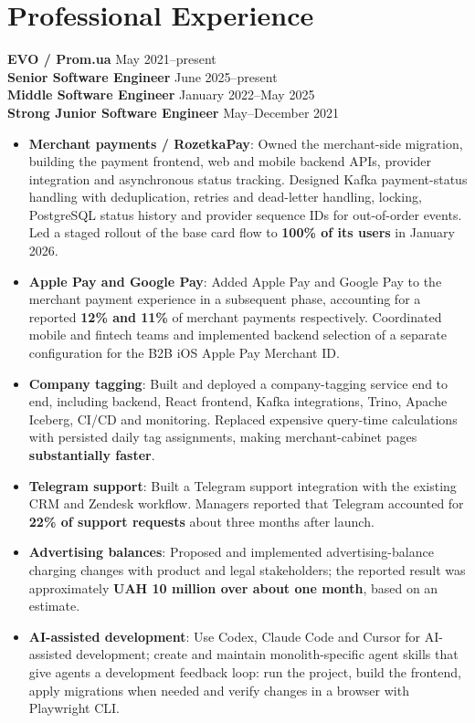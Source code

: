 \documentclass[11pt,a4paper,sans]{moderncv}
\begin{document}
\section{Professional Experience}
\noindent\textbf{EVO / Prom.ua} \hfill May 2021--present\\[3pt]
\textbf{Senior Software Engineer} \hfill June 2025--present\\[2pt]
\textbf{Middle Software Engineer} \hfill January 2022--May 2025\\[2pt]
\textbf{Strong Junior Software Engineer} \hfill May--December 2021
\par\vspace{3pt}
\begin{itemize}
\item \textbf{Merchant payments / RozetkaPay}: Owned the merchant-side migration, building the payment frontend, web and mobile backend APIs, provider integration and asynchronous status tracking. Designed Kafka payment-status handling with deduplication, retries and dead-letter handling, locking, PostgreSQL status history and provider sequence IDs for out-of-order events. Led a staged rollout of the base card flow to \textbf{100\% of its users} in January 2026.
\item \textbf{Apple Pay and Google Pay}: Added Apple Pay and Google Pay to the merchant payment experience in a subsequent phase, accounting for a reported \textbf{12\% and 11\%} of merchant payments respectively. Coordinated mobile and fintech teams and implemented backend selection of a separate configuration for the B2B iOS Apple Pay Merchant ID.
\item \textbf{Company tagging}: Built and deployed a company-tagging service end to end, including backend, React frontend, Kafka integrations, Trino, Apache Iceberg, CI/CD and monitoring. Replaced expensive query-time calculations with persisted daily tag assignments, making merchant-cabinet pages \textbf{substantially faster}.
\item \textbf{Telegram support}: Built a Telegram support integration with the existing CRM and Zendesk workflow. Managers reported that Telegram accounted for \textbf{22\% of support requests} about three months after launch.
\item \textbf{Advertising balances}: Proposed and implemented advertising-balance charging changes with product and legal stakeholders; the reported result was approximately \textbf{UAH 10 million over about one month}, based on an estimate.
\item \textbf{AI-assisted development}: Use Codex, Claude Code and Cursor for AI-assisted development; create and maintain monolith-specific agent skills that give agents a development feedback loop: run the project, build the frontend, apply migrations when needed and verify changes in a browser with Playwright CLI.

\end{itemize}
\end{document}
